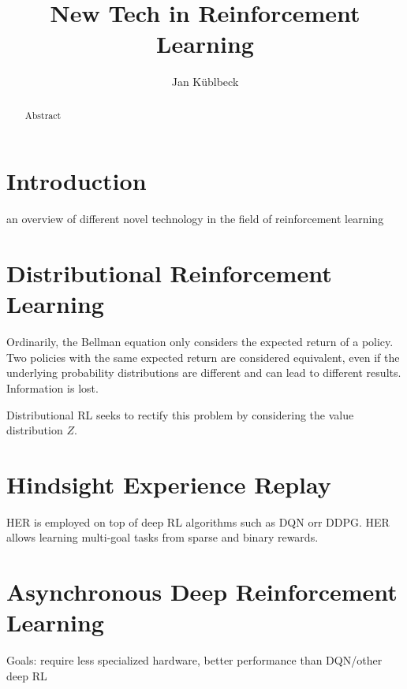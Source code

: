 \documentclass[runningheads]{llncs}
\begin{document}
%
\title{New Tech in Reinforcement Learning}
%
%
\author{Jan Küblbeck}
%
%
\institute{}
%
\maketitle              %
%
\begin{abstract}
Abstract
\end{abstract}
%
%
%
\section{Introduction}

an overview of different novel technology in the field of reinforcement learning

\section{Distributional Reinforcement Learning}

Ordinarily, the Bellman equation only considers the expected return of a policy. Two policies with the same expected return are considered equivalent, even if the underlying probability distributions are different and can lead to different results. Information is lost.

Distributional RL seeks to rectify this problem by considering the value distribution $Z$.\cite{bellemare2017distributional}

\section{Hindsight Experience Replay}

HER is employed on top of deep RL algorithms such as DQN orr DDPG. HER allows learning multi-goal tasks from sparse and binary rewards.\cite{andrychowicz2017hindsight}

\section{Asynchronous Deep Reinforcement Learning}

Goals: require less specialized hardware, better performance than DQN/other deep RL
\end{document}
